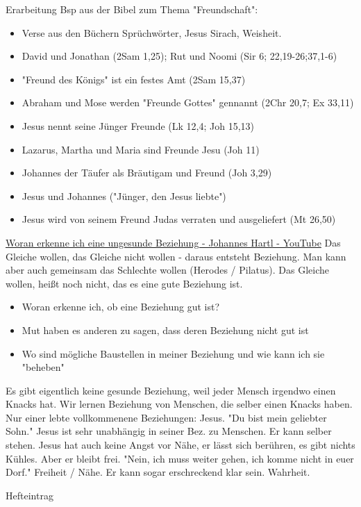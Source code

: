 \documentclass[pdftex,a4paper,12pt,bibliography=totoc,draft]{scrartcl}
\begin{document}
\begin{frame}[label={sec:org5dbdc9e}]{Erarbeitung}
Bsp aus der Bibel zum Thema "Freundschaft":
\begin{itemize}
\item Verse aus den Büchern Sprüchwörter, Jesus Sirach, Weisheit.
\item David und Jonathan (2Sam 1,25); Rut und Noomi (Sir 6; 22,19-26;37,1-6)
\item "Freund des Königs" ist ein festes Amt (2Sam 15,37)
\item Abraham und Mose werden "Freunde Gottes" gennannt (2Chr 20,7; Ex 33,11)
\item Jesus nennt seine Jünger Freunde (Lk 12,4; Joh 15,13)
\item Lazarus, Martha und Maria sind Freunde Jesu (Joh 11)
\item Johannes der Täufer als Bräutigam und Freund (Joh 3,29)
\item Jesus und Johannes ("Jünger, den Jesus liebte")
\item Jesus wird von seinem Freund Judas verraten und ausgeliefert (Mt 26,50)
\end{itemize}

\href{https://www.youtube.com/watch?v=3hR64GCyOg0}{Woran erkenne ich eine ungesunde Beziehung - Johannes Hartl - YouTube}
Das Gleiche wollen, das Gleiche nicht wollen - daraus entsteht Beziehung. Man kann aber auch gemeinsam das Schlechte wollen (Herodes / Pilatus).
Das Gleiche wollen, heißt noch nicht, das es eine gute Beziehung ist.

\begin{itemize}
\item Woran erkenne ich, ob eine Beziehung gut ist?
\item Mut haben es anderen zu sagen, dass deren Beziehung nicht gut ist
\item Wo sind mögliche Baustellen in meiner Beziehung und wie kann ich sie "beheben"
\end{itemize}

Es gibt eigentlich keine gesunde Beziehung, weil jeder Mensch irgendwo einen Knacks hat. Wir lernen Beziehung von Menschen, die selber einen Knacks haben. Nur einer lebte vollkommenene Beziehungen: Jesus. "Du bist mein geliebter Sohn." Jesus ist sehr unabhängig in seiner Bez. zu Menschen. Er kann selber stehen. Jesus hat auch keine Angst vor Nähe, er lässt sich berühren, es gibt nichts Kühles. Aber er bleibt frei. "Nein, ich muss weiter gehen, ich komme nicht in euer Dorf." Freiheit / Nähe. Er kann sogar erschreckend klar sein. Wahrheit.
\end{frame}



\begin{frame}[label={sec:orge45485a}]{Hefteintrag}
\end{frame}
\end{document}

